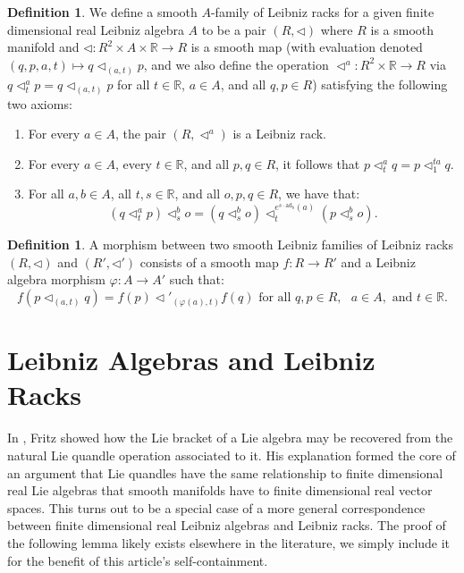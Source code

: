 \documentclass[12pt]{amsart}
\theoremstyle{plain}
\theoremstyle{definition}
\newtheorem{definition}[theorem]{Definition}
\begin{document}
\begin{definition}
    We define a smooth $A$-family of Leibniz racks for a given finite dimensional real Leibniz algebra $A$ to be a pair $(R,\triangleleft )$ where $R$ is a smooth manifold and $\triangleleft:R^2\times A\times \mathbb{R} \to R$ is a smooth map (with evaluation denoted $(q,p,a,t) \mapsto q\triangleleft_{(a,t)}p$, and we also define the operation $\triangleleft^a:R^2 \times \mathbb{R} \to R$ via $q\triangleleft^a_t p = q\triangleleft_{(a,t)}p$ for all $t \in \mathbb{R}$, $a \in A$, and all $q,p \in R$) satisfying the following two axioms:

\begin{enumerate}
    \item 
    For every $a \in A$, the pair $(R,\triangleleft^a)$ is a Leibniz rack.

    \item For every $a \in A$, every $t \in \mathbb{R}$, and all $p,q \in R$, it follows that $ p \triangleleft_t^a  q =p \triangleleft_{1}^{ta} q$.

\item  For all $a,b \in A$, all $t,s \in \mathbb{R}$, and all $o,p,q \in R$, we have that:
$$ (q \triangleleft_t^a p) \triangleleft_s^b o = (q  \triangleleft_{s}^b o ) \triangleleft_{ t }^{e^{s \cdot \text{ad}_b}(a)} (p  \triangleleft_{s}^b o ). $$

\end{enumerate}
\end{definition}



\begin{definition}
  A morphism between two smooth Leibniz families of Leibniz racks $(R, \triangleleft   )$ and $(R',\triangleleft')$ consists of a smooth map $f:R\to R'$ and a Leibniz algebra morphism $\varphi:A \to A'$ such that: $$f( p \triangleleft_{(a,t)} q) = f(p) \triangleleft'_{(\varphi(a),t)} f(q) \text{ for all }q,p \in R, \text{ }a\in A, \text{ and }t \in \mathbb{R}.$$
\end{definition}


\section{Leibniz Algebras and Leibniz Racks} \label{Sec3}



In \cite{Fritz}, Fritz showed how the Lie bracket of a Lie algebra may be recovered from the natural Lie quandle operation associated to it. His explanation formed the core of an argument that Lie quandles have the same relationship to finite dimensional real Lie algebras that smooth manifolds have to finite dimensional real vector spaces. This turns out to be a special case of a more general correspondence between finite dimensional real Leibniz algebras and Leibniz racks. The proof of the following lemma likely exists elsewhere in the literature, we simply include it for the benefit of this article's self-containment.
\end{document}
